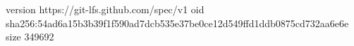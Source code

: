 version https://git-lfs.github.com/spec/v1
oid sha256:54ad6a15b3b39f1f590ad7dcb535e37be0ce12d549ffd1ddb0875cd732aa6e6e
size 349692
